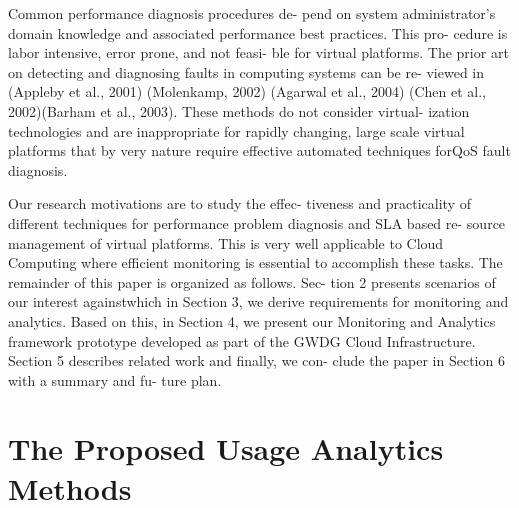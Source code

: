 \documentclass{llncs}
\begin{document}
Common performance diagnosis procedures de-
pend on system administrator’s domain knowledge and associated performance best practices. This pro- cedure is labor intensive, error prone, and not feasi- ble for virtual platforms. The prior art on detecting and diagnosing faults in computing systems can be re- viewed in (Appleby et al., 2001) (Molenkamp, 2002) (Agarwal et al., 2004) (Chen et al., 2002)(Barham et al., 2003). These methods do not consider virtual- ization technologies and are inappropriate for rapidly changing, large scale virtual platforms that by very nature require effective automated techniques forQoS fault diagnosis.

Our research motivations are to study the effec-
tiveness and practicality of different techniques for performance problem diagnosis and SLA based re- source management of virtual platforms. This is very well applicable to Cloud Computing where efficient monitoring is essential to accomplish these tasks. The remainder of this paper is organized as follows. Sec- tion 2 presents scenarios of our interest againstwhich in Section 3, we derive requirements for monitoring and analytics. Based on this, in Section 4, we present our Monitoring and Analytics framework prototype developed as part of the GWDG Cloud Infrastructure. Section 5 describes related work and finally, we con- clude the paper in Section 6 with a summary and fu- ture plan.



\section{The Proposed Usage Analytics Methods}
\end{document}
